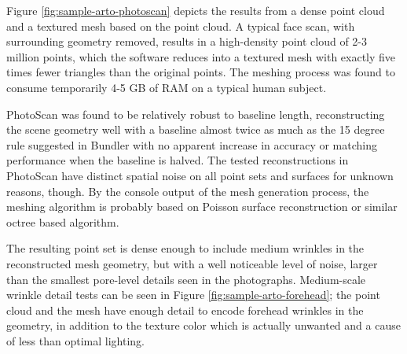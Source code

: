 

Figure \ref{fig:sample-arto-photoscan} depicts the results from a dense point cloud and a textured mesh based on the point cloud.
A typical face scan, with surrounding geometry removed, results in a high-density point cloud of 2-3 million points, which the software reduces into a textured mesh with exactly five times fewer triangles than the original points.
The meshing process was found to consume temporarily 4-5 GB of RAM on a typical human subject.

PhotoScan was found to be relatively robust to baseline length, reconstructing the scene geometry well with a baseline almost twice as much as the 15 degree rule suggested in Bundler with no apparent increase in accuracy or matching performance when the baseline is halved.
The tested reconstructions in PhotoScan have distinct spatial noise on all point sets and surfaces for unknown reasons, though.
By the console output of the mesh generation process, the meshing algorithm is probably based on Poisson surface reconstruction or similar octree based algorithm.

The resulting point set is dense enough to include medium wrinkles in the reconstructed mesh geometry, but with a well noticeable level of noise, larger than the smallest pore-level details seen in the photographs.
Medium-scale wrinkle detail tests can be seen in Figure \ref{fig:sample-arto-forehead}; the point cloud and the mesh have enough detail to encode forehead wrinkles in the geometry, in addition to the texture color which is actually unwanted and a cause of less than optimal lighting.

